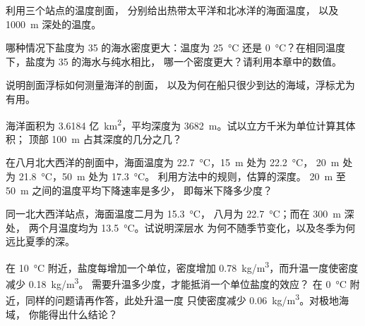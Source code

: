 \begin{exercise}[$\star$]\label{exo:g10:layered-ocean:3}
利用三个站点的温度剖面，
分别给出热带太平洋和北冰洋的海面温度，
以及 \qty{1000}{m} 深处的温度。
\end{exercise}

\begin{exercise}[$\star$]\label{exo:g10:layered-ocean:4}
哪种情况下盐度为 35 的海水密度更大：温度为 \qty{25}{\degreeCelsius}
还是 \qty{0}{\degreeCelsius}？在相同温度下，盐度为 35 的海水与纯水相比，
哪一个密度更大？请利用本章中的数值。
\end{exercise}

\begin{exercise}[$\star$]\label{exo:g10:layered-ocean:5}
说明剖面浮标如何测量海洋的剖面，
以及为何在船只很少到达的海域，浮标尤为有用。
\end{exercise}

\begin{exercise}[$\star\star$]\label{exo:g10:layered-ocean:6}
海洋面积为 3.6184 亿~\unit{km^2}，平均深度为
\qty{3682}{m}。试以立方千米为单位计算其体积；
顶部 \qty{100}{m} 占其深度的几分之几？
\end{exercise}

\begin{exercise}[$\star\star$]\label{exo:g10:layered-ocean:7}
在八月北大西洋的剖面中，海面温度为
\qty{22.7}{\degreeCelsius}，\qty{15}{m} 处为 \qty{22.2}{\degreeCelsius}，
\qty{20}{m} 处为 \qty{21.8}{\degreeCelsius}，\qty{50}{m} 处为 \qty{17.3}{\degreeCelsius}。
利用方法中的规则，估算的深度。
\qty{20}{m} 至 \qty{50}{m} 之间的温度平均下降速率是多少，
即每米下降多少度？
\end{exercise}

\begin{exercise}[$\star\star$]\label{exo:g10:layered-ocean:8}
同一北大西洋站点，海面温度二月为 \qty{15.3}{\degreeCelsius}，
八月为 \qty{22.7}{\degreeCelsius}；而在 \qty{300}{m} 深处，
两个月温度均为 \qty{13.5}{\degreeCelsius}。试说明深层水
为何不随季节变化，以及冬季为何
远比夏季的深。
\end{exercise}

\begin{exercise}[$\star\star$]\label{exo:g10:layered-ocean:9}
在 \qty{10}{\degreeCelsius} 附近，盐度每增加一个单位，密度增加
\qty{0.78}{kg/m^3}，而升温一度使密度减少 \qty{0.18}{kg/m^3}。
需要升温多少度，才能抵消一个单位盐度的效应？
在 \qty{0}{\degreeCelsius} 附近，同样的问题请再作答，此处升温一度
只使密度减少 \qty{0.06}{kg/m^3}。对极地海域，
你能得出什么结论？
\end{exercise}

